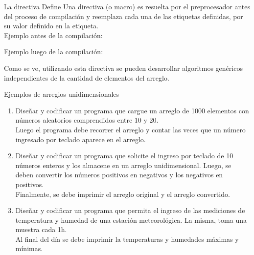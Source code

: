 \documentclass[xcolor=pdftex,table,11pt]{beamer}
\begin{document}
\begin{frame}{La directiva Define}
Una directiva (o macro) es resuelta por el preprocesador antes del proceso de compilación y reemplaza cada una de las etiquetas definidas, por su valor definido en la etiqueta.\\
\vspace{0.5cm}
Ejemplo antes de la compilación:
\codesetstylefrombeamer
{}

Ejemplo luego de la compilación:
\codesetstylefrombeamer
{}


\vspace{0.5cm}
Como se ve, utilizando esta directiva se pueden desarrollar algoritmos genéricos independientes de la cantidad de elementos del arreglo.



\end{frame}




\begin{frame}{Ejemplos de arreglos unidimensionales}
 \begin{enumerate}
   
        \item Diseñar y codificar un programa que cargue un arreglo de 1000 elementos con números aleatorios comprendidos entre 10 y 20.\\
   Luego el programa debe recorrer el arreglo y contar las veces que un número ingresado por teclado aparece en el arreglo.
\href{https://github.com/danis963/informaticaI_IUA/blob/main/c/src/8-0-arrays.c}{}


     \item Diseñar y codificar un programa que solicite el ingreso por teclado de 10 números enteros y los almacene en un arreglo unidimensional. Luego, se deben convertir los números positivos en negativos y los negativos en positivos.\\
Finalmente, se debe imprimir el arreglo original y el arreglo convertido.
\href{https://github.com/danis963/informaticaI_IUA/blob/main/c/src/8-1arrays.c}{}

        \item Diseñar y codificar un programa que permita el ingreso de las mediciones de temperatura y humedad de una estación meteorológica. La misma, toma una muestra cada 1h. \\
        Al final del día se debe imprimir la temperaturas y humedades máximas y mínimas.
\href{https://github.com/danis963/informaticaI_IUA/blob/main/c/src/8-2arrays.c}{}

   \end{enumerate}
\end{frame}
\end{document}
